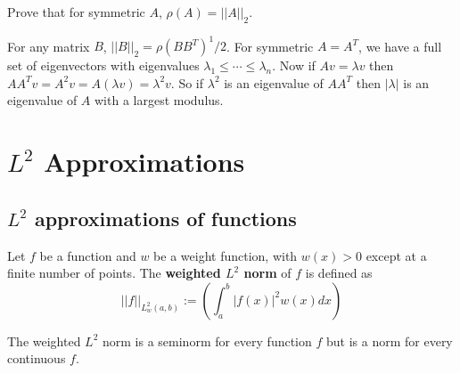 \begin{example}
	Prove that for symmetric $A$, $\rho(A) = ||A||_2$.

	For any matrix $B$, $||B||_2 = \rho{(B B^T)}^1/2$. For symmetric $A = A^T$, we have a full set of eigenvectors with eigenvalues $\lambda_1 \le \cdots \le \lambda_n$. Now if $Av = \lambda v$ then $A A^T v = A^2 v = A(\lambda v) = \lambda^2 v$. So if $\lambda^2$ is an eigenvalue of $A A^T$ then $|\lambda|$ is an eigenvalue of $A$ with a largest modulus.
\end{example}

\section{$L^2$ Approximations}

\subsection{$L^2$ approximations of functions}

\begin{definition}
	Let $f$ be a function and $w$ be a weight function, with $w(x) > 0$ except at a finite number of points. The \textbf{weighted $L^2$ norm} of $f$ is defined as
	\[
		||f||_{L^2_w (a, b)} := \left( \int_{a}^{b} |f(x)|^2 w(x) dx \right)
	\]
\end{definition}

\begin{remark}
	The weighted $L^2$ norm is a seminorm for every function $f$ but is a norm for every continuous $f$.
\end{remark}

